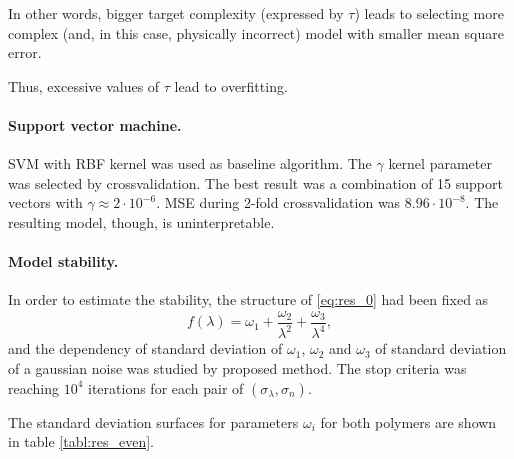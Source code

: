 \documentclass[11pt,a4paper]{article}
\theoremstyle{definition}
\begin{document}
In other words, bigger target complexity (expressed by $\tau$) leads to selecting
more complex (and, in this case, physically incorrect) model with smaller mean square error.

Thus, excessive values of $\tau$ lead to overfitting.

\paragraph{Support vector machine.}

SVM with RBF kernel \citep{Vapnik79_en} was used as baseline algorithm. The $\gamma$ kernel
parameter was selected by crossvalidation. The best result was a combination of 15
support vectors with $\gamma \approx 2 \cdot 10^{-6}$. MSE during 2-fold crossvalidation
was $8.96 \cdot 10^{-8}$. The resulting model, though, is uninterpretable.

\paragraph{Model stability.}

In order to estimate the stability, the structure of \eqref{eq:res_0} had been fixed as
\[
  f(\lambda) = \omega_1 + \frac{\omega_2}{\lambda^2} + \frac{\omega_3}{\lambda^4},
\]
and the dependency of standard deviation of $\omega_1$, $\omega_2$ and $\omega_3$
of standard deviation of a gaussian noise was studied by proposed method.
The stop criteria was reaching $10^4$ iterations for each pair of $(\sigma_{\lambda}, \sigma_n)$.

The standard deviation surfaces for parameters $\omega_i$ for both polymers are shown in
table \ref{tabl:res_even}.
\end{document}
